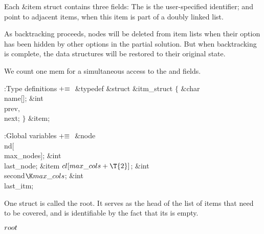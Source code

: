 Each \&{item} struct contains three fields:
The  is the user-specified identifier;
 and  point to adjacent items, when this
item is part of a doubly linked list.

As backtracking proceeds, nodes
will be deleted from item lists when their option has been hidden by
other options in the partial solution.
But when backtracking is complete, the data structures will be
restored to their original state.

We count one mem for a simultaneous access to the  and  fields.

\Y\B\4:Type definitions\X${}\mathrel+\equiv{}$\6
\&{typedef} \&{struct} \&{itm\_struct} ${}\{{}$\1\6
\&{char} \\{name}[];\6
\&{int} \\{prev}${},{}$ \\{next};\2\6
${}\}{}$ \&{item};\par
\fi

\B{}:Global variables\X${}\mathrel+\equiv{}$\6
\&{node} \\{nd}[\\{max\_nodes}];\6
\&{int} \\{last\_node};\6
\&{item} ${}\\{cl}[\\{max\_cols}+\T{2}]{}$;\6
\&{int} \\{second}${}\K\\{max\_cols}{}$;\6
\&{int} \\{last\_itm};%
\par
\fi

One  struct is called the root. It serves as the head of the
list of items that need to be covered, and is identifiable by the fact
that its  is empty.

\Y\B\4\D$\\{root}$ \5
\par
\fi

